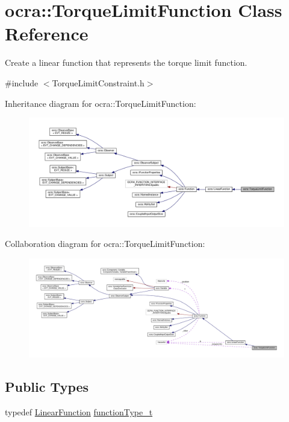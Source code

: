 \hypertarget{classocra_1_1TorqueLimitFunction}{}\section{ocra\+:\+:Torque\+Limit\+Function Class Reference}
\label{classocra_1_1TorqueLimitFunction}


Create a linear function that represents the torque limit function.  




{\ttfamily \#include $<$Torque\+Limit\+Constraint.\+h$>$}



Inheritance diagram for ocra\+:\+:Torque\+Limit\+Function\+:
\nopagebreak
\begin{figure}[H]
\begin{center}
\leavevmode
\includegraphics[width=350pt]{db/d0c/classocra_1_1TorqueLimitFunction__inherit__graph}
\end{center}
\end{figure}


Collaboration diagram for ocra\+:\+:Torque\+Limit\+Function\+:
\nopagebreak
\begin{figure}[H]
\begin{center}
\leavevmode
\includegraphics[width=350pt]{df/df1/classocra_1_1TorqueLimitFunction__coll__graph}
\end{center}
\end{figure}
\subsection*{Public Types}
\begin{DoxyCompactItemize}
\item 
typedef \hyperlink{classocra_1_1LinearFunction}{Linear\+Function} \hyperlink{classocra_1_1TorqueLimitFunction_a0c9d97d4e11ee173ae359698d6c95b25}{function\+Type\+\_\+t}
\end{DoxyCompactItemize}
